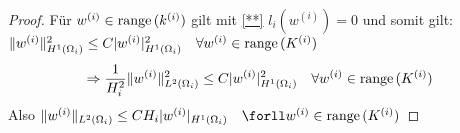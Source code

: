 \begin{proof}
  Für $w^{(i)}\in\textnormal{range}\,(k^{(i)})$ gilt mit \eqref{**} $l_i(w^{(i)})=0$ und somit gilt: $\|w^{(i)}\|_{H^1(\Omega_i)}^2 \leq C|w^{(i)}|_{H^1(\Omega_i)}^2 \quad \forall w^{(i)}\in\textnormal{range}\,(K^{(i)})$
  \[
    \Rightarrow \frac{1}{H_i^2} \|w^{(i)}\|_{L^2(\Omega_i)}^2 \leq C |w^{(i)}|_{H^1(\Omega_i)}^2 \quad \forall w^{(i)}\in\textnormal{range}\,(K^{(i)})
  \]
  Also $\norm{w^{(i)}}_{L^2(\Omega_i)} \leq CH_i |w^{(i)}|_{H^1(\Omega_i)} \quad \forll w^{(i)}\in\range(K^{(i)})$

\end{proof}
